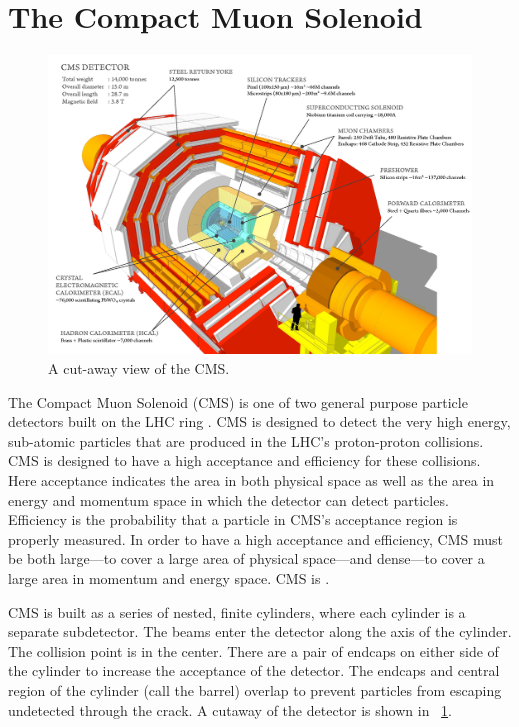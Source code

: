 \section{The Compact Muon Solenoid}
\label{cms_section}

\begin{figure}[tb]
    \centering
    \includegraphics[width=\textwidth]{figures/cms_cutaway.png}
    \caption{A cut-away view of the CMS.}
    \label{fig:cms_cutaway}
\end{figure}

The Compact Muon Solenoid (CMS) is one of two general purpose particle
detectors built on the LHC ring \cite{cms_tdr_1}\cite{cms_tdr_2}. CMS is
designed to detect the very high energy, sub-atomic particles that are produced
in the LHC's proton-proton collisions. CMS is designed to have a high
acceptance and efficiency for these collisions. Here acceptance indicates the
area in both physical space as well as the area in energy and momentum space in
which the detector can detect particles. Efficiency is the probability that a
particle in CMS's acceptance region is properly measured. In order to have a
high acceptance and efficiency, CMS must be both large---to cover a large area
of physical space---and dense---to cover a large area in momentum and energy
space. CMS is .

CMS is built as a series of nested, finite cylinders, where each cylinder is a
separate subdetector. The beams enter the detector along the axis of the
cylinder. The collision point is in the center. There are a pair of endcaps on
either side of the cylinder to increase the acceptance of the detector. The
endcaps and central region of the cylinder (call the barrel) overlap to prevent
particles from escaping undetected through the crack. A cutaway of the detector
is shown in \FIG~\ref{fig:cms_cutaway}.

